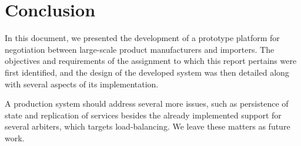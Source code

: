 
\section{Conclusion}
\label{sec:conclusion}

In this document, we presented the development of a prototype platform for negotiation between large-scale product manufacturers and importers.
The objectives and requirements of the assignment to which this report pertains were first identified, and the design of the developed system was then detailed along with several aspects of its implementation.

A production system should address several more issues, such as persistence of state and replication of services besides the already implemented support for several arbiters, which targets load-balancing.
We leave these matters as future work.

